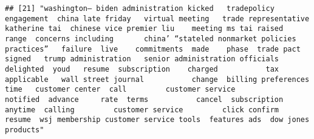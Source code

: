 \documentclass[
]{article}
\begin{document}
\begin{verbatim}
## [21] "washington— biden administration kicked   tradepolicy engagement  china late friday   virtual meeting   trade representative katherine tai  chinese vice premier liu    meeting ms tai raised  range  concerns including       china’ “stateled nonmarket policies  practices”   failure  live    commitments  made    phase  trade pact signed   trump administration   senior administration officials   delighted  youd   resume  subscription    charged           tax          applicable   wall street journal           change  billing preferences   time   customer center  call         customer service            notified  advance     rate  terms           cancel  subscription  anytime  calling         customer service         click confirm  resume  wsj membership customer service tools  features ads  dow jones products"                                                                                                                                                                                                                                                                                                                                                                                                                                                                                                                                                                                                                                                                                                                                                                                                                                                                                                                                                                                                                                                                                                                                                                                                                                                                                                                                                                                                                                                                                                                                                                                                                                                                                                                                                                                                                                                                                                                                                                                                                                                                                                                                                                                                                                                                                                                                                                                                                                                                                                                                                                                             
\end{verbatim}
\end{document}

